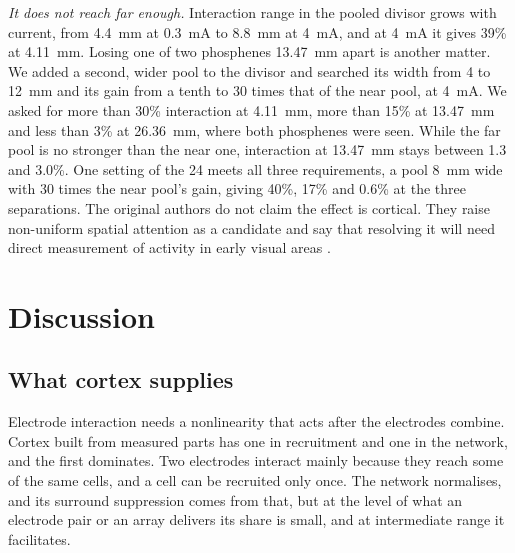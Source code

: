 \documentclass[10pt,twocolumn]{article}
\begin{document}
\textit{It does not reach far enough.} Interaction range in the pooled
divisor grows with current, from 4.4~mm at 0.3~mA to 8.8~mm at 4~mA, and
at 4~mA it gives 39\% at 4.11~mm. Losing one of two phosphenes 13.47~mm
apart is another matter. We added a second, wider pool to the divisor and
searched its width from 4 to 12~mm and its gain from a tenth to 30 times
that of the near pool, at 4~mA. We asked for more than 30\% interaction at
4.11~mm, more than 15\% at 13.47~mm and less than 3\% at 26.36~mm, where
both phosphenes were seen. While the far pool is no stronger than the near
one, interaction at 13.47~mm stays between 1.3 and 3.0\%. One setting of
the 24 meets all three requirements, a pool 8~mm wide with 30 times the
near pool's gain, giving 40\%, 17\% and 0.6\% at the three separations.
The original authors do not claim the effect is cortical. They
raise non-uniform spatial attention as a candidate and say that resolving
it will need direct measurement of activity in early visual areas
\citep{bosking2022}.

\begin{table}[t]
\centering
\caption{What each hypothesis predicts. The calibrated column gives the
  range across the nineteen variants of table~\ref{tab:t4} in brackets
  where it was tracked. The dense column refits recruitment to every cell
  that responds in awake cortex (section~\ref{sec:awake}), an upper bound
  on occupancy, on the same grid and map. Not run marks predictions
  computed with the calibration only. Searches for the current that holds
  brightness stop at 20~mA for the measured parts and 200~mA for the
  pooled divisor. The structural result holds in all three, since both
  nonlinearities of the measured-parts model act on the combined input.}
\label{tab:t5}
\small

\end{table}

\section{Discussion}

\subsection{What cortex supplies}

Electrode interaction needs a nonlinearity that acts after the electrodes
combine. Cortex built from measured parts has one in recruitment and one
in the network, and the first dominates. Two electrodes interact mainly
because they reach some of the same cells, and a cell can be recruited
only once. The network normalises, and its surround suppression comes
from that, but at the level of what an electrode pair or an array delivers
its share is small, and at intermediate range it facilitates.
\end{document}
